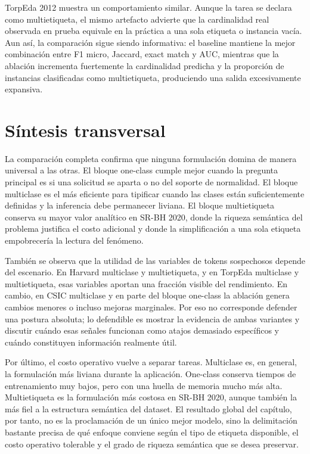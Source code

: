 \documentclass[12pt,oneside]{report}
\begin{document}
TorpEda 2012 muestra un comportamiento similar. Aunque la tarea se declara como multietiqueta, el mismo artefacto advierte que la cardinalidad real observada en prueba equivale en la práctica a una sola etiqueta o instancia vacía. Aun así, la comparación sigue siendo informativa: el baseline mantiene la mejor combinación entre F1 micro, Jaccard, exact match y AUC, mientras que la ablación incrementa fuertemente la cardinalidad predicha y la proporción de instancias clasificadas como multietiqueta, produciendo una salida excesivamente expansiva.\

\section{Síntesis transversal}
La comparación completa confirma que ninguna formulación domina de manera universal a las otras. El bloque one-class cumple mejor cuando la pregunta principal es si una solicitud se aparta o no del soporte de normalidad. El bloque multiclase es el más eficiente para tipificar cuando las clases están suficientemente definidas y la inferencia debe permanecer liviana. El bloque multietiqueta conserva su mayor valor analítico en SR-BH 2020, donde la riqueza semántica del problema justifica el costo adicional y donde la simplificación a una sola etiqueta empobrecería la lectura del fenómeno.\

También se observa que la utilidad de las variables de tokens sospechosos depende del escenario. En Harvard multiclase y multietiqueta, y en TorpEda multiclase y multietiqueta, esas variables aportan una fracción visible del rendimiento. En cambio, en CSIC multiclase y en parte del bloque one-class la ablación genera cambios menores o incluso mejoras marginales. Por eso no corresponde defender una postura absoluta; lo defendible es mostrar la evidencia de ambas variantes y discutir cuándo esas señales funcionan como atajos demasiado específicos y cuándo constituyen información realmente útil.\

Por último, el costo operativo vuelve a separar tareas. Multiclase es, en general, la formulación más liviana durante la aplicación. One-class conserva tiempos de entrenamiento muy bajos, pero con una huella de memoria mucho más alta. Multietiqueta es la formulación más costosa en SR-BH 2020, aunque también la más fiel a la estructura semántica del dataset. El resultado global del capítulo, por tanto, no es la proclamación de un único mejor modelo, sino la delimitación bastante precisa de qué enfoque conviene según el tipo de etiqueta disponible, el costo operativo tolerable y el grado de riqueza semántica que se desea preservar.\
\end{document}
